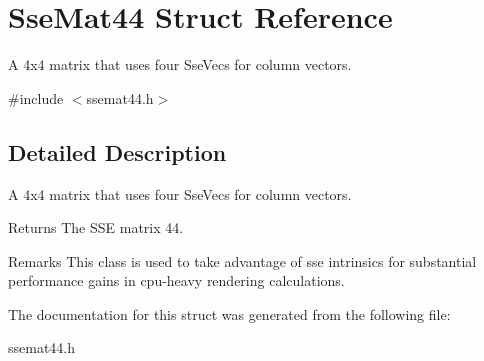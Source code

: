 \hypertarget{struct_sse_mat44}{}\section{Sse\+Mat44 Struct Reference}
\label{struct_sse_mat44}


A 4x4 matrix that uses four Sse\+Vecs for column vectors.  




{\ttfamily \#include $<$ssemat44.\+h$>$}



\subsection{Detailed Description}
A 4x4 matrix that uses four Sse\+Vecs for column vectors. 

\begin{DoxyReturn}{Returns}
The S\+S\+E matrix 44.
\end{DoxyReturn}
\begin{DoxyRemark}{Remarks}
This class is used to take advantage of sse intrinsics for substantial performance gains in cpu-\/heavy rendering calculations. 
\end{DoxyRemark}


The documentation for this struct was generated from the following file\+:\begin{DoxyCompactItemize}
\item 
ssemat44.\+h\end{DoxyCompactItemize}
